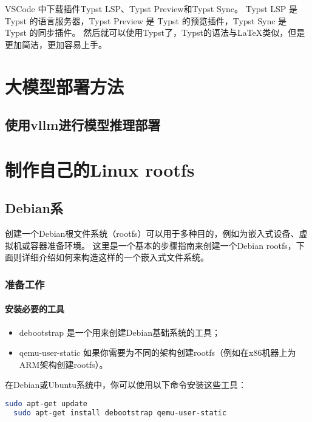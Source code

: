 \documentclass[lang=cn,a4paper,newtx]{elegantpaper}
\begin{document}
VSCode 中下载插件Typst LSP、Typst Preview和Typst Sync。
Typst LSP 是 Typst 的语言服务器，Typst Preview 是 Typst 的预览插件，Typst Sync 是 Typst 的同步插件。
然后就可以使用Typst了，Typst的语法与LaTeX类似，但是更加简洁，更加容易上手。

\section{大模型部署方法}
\subsection{使用vllm进行模型推理部署}
\section{制作自己的Linux rootfs}
\subsection{Debian系}
创建一个Debian根文件系统（rootfs）可以用于多种目的，例如为嵌入式设备、虚拟机或容器准备环境。
这里是一个基本的步骤指南来创建一个Debian rootfs，下面则详细介绍如何来构造这样的一个嵌入式文件系统。
\subsubsection{准备工作}
\paragraph{安装必要的工具}
\begin{itemize}
  \item debootstrap 是一个用来创建Debian基础系统的工具；
  \item qemu-user-static 如果你需要为不同的架构创建rootfs（例如在x86机器上为ARM架构创建rootfs）。
\end{itemize}
在Debian或Ubuntu系统中，你可以使用以下命令安装这些工具：
\begin{lstlisting}[language=bash]
  sudo apt-get update
  sudo apt-get install debootstrap qemu-user-static
\end{lstlisting}
\end{document}
